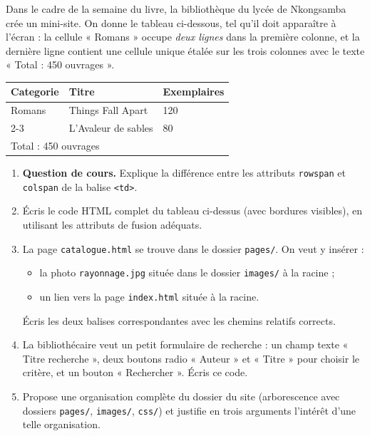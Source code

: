 \documentclass[11pt]{article}
\begin{document}
\begin{exercice}
Dans le cadre de la semaine du livre, la bibliothèque du lycée de Nkongsamba crée un mini-site. On donne le tableau ci-dessous, tel qu'il doit apparaître à l'écran : la cellule « Romans » occupe \emph{deux lignes} dans la première colonne, et la dernière ligne contient une cellule unique étalée sur les trois colonnes avec le texte « Total : 450 ouvrages ».
\begin{center}
\begin{tabularx}{\linewidth}{|l|X|X|}
\hline
\rowcolor{popblueL} \textbf{Categorie} & \textbf{Titre} & \textbf{Exemplaires} \\
\hline
Romans & Things Fall Apart & 120 \\
\cline{2-3}
 & L'Avaleur de sables & 80 \\
\hline
\multicolumn{3}{|l|}{Total : 450 ouvrages} \\
\hline
\end{tabularx}
\end{center}
\begin{enumerate}
  \item \textbf{Question de cours.} Explique la différence entre les attributs \texttt{rowspan} et \texttt{colspan} de la balise \texttt{<td>}.
  \item Écris le code HTML complet du tableau ci-dessus (avec bordures visibles), en utilisant les attributs de fusion adéquats.
  \item La page \texttt{catalogue.html} se trouve dans le dossier \texttt{pages/}. On veut y insérer :
  \begin{itemize}
    \item la photo \texttt{rayonnage.jpg} située dans le dossier \texttt{images/} à la racine ;
    \item un lien vers la page \texttt{index.html} située à la racine.
  \end{itemize}
  Écris les deux balises correspondantes avec les chemins relatifs corrects.
  \item La bibliothécaire veut un petit formulaire de recherche : un champ texte « Titre recherche », deux boutons radio « Auteur » et « Titre » pour choisir le critère, et un bouton « Rechercher ». Écris ce code.
  \item Propose une organisation complète du dossier du site (arborescence avec dossiers \texttt{pages/}, \texttt{images/}, \texttt{css/}) et justifie en trois arguments l'intérêt d'une telle organisation.
\end{enumerate}
\end{exercice}
\end{document}
